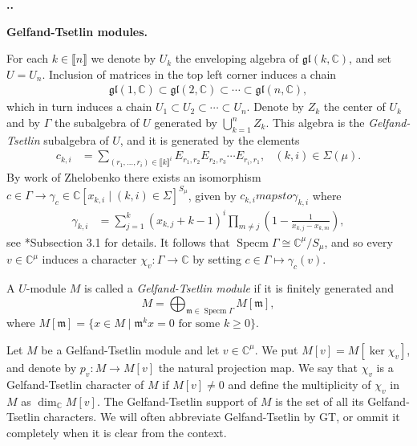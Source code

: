 \documentclass[11pt,fleqn]{amsart}
\renewcommand\thesection{\arabic{section}}
\newcounter{para}[section]
\renewcommand\thepara{\thesection.\arabic{para}}
\def\paragraph{%
 \noindent
 \refstepcounter{para}%
 \textbf{\thepara.}\hspace{1ex}%
}
\newcommand\about[1]{%
 {\bfseries#1.}%
}
\newcommand\CC{\mathbb C}
\renewcommand\to{\longrightarrow}
\newcommand\m{\mathfrak m}
\newcommand\gl{\mathfrak{gl}}
\newcommand\interval[1]{\llbracket #1 \rrbracket}
\DeclareMathOperator\Specm{Specm}
\begin{document}
\paragraph
\about{Gelfand-Tsetlin modules}
For each $k \in \interval{n}$ we denote by $U_k$ the enveloping algebra of 
$\gl(k,\CC)$, and set $U = U_n$. Inclusion of matrices in the top left corner 
induces a chain
\begin{align*}
\gl(1,\CC) \subset \gl(2, \CC) \subset \cdots \subset \gl(n,\CC),
\end{align*}
which in turn induces a chain $U_1 \subset U_2 \subset \cdots \subset U_n$. 
Denote by $Z_k$ the center of $U_k$ and by $\Gamma$ the subalgebra of $U$ 
generated by $\bigcup_{k=1}^n Z_k$. This algebra is the \emph{Gelfand-Tsetlin} 
subalgebra of $U$, and it is generated by the elements
\begin{align*}
c_{k,i}
  &= \sum_{(r_1, \ldots, r_i) \in \interval{k}^i} 
    E_{r_1, r_2} E_{r_2, r_3} \cdots E_{r_i, r_1},
  & (k,i) \in \Sigma(\mu).
\end{align*}
By work of Zhelobenko there exists an isomorphism $c \in \Gamma \to \gamma_c
\in \CC[x_{k,i} \mid (k,i) \in \Sigma]^{S_\mu}$, given by $c_{k,i} mapsto 
\gamma_{k,i}$ where
\begin{align*}
\gamma_{k,i}
  &= \sum_{j=1}^k (x_{k,j} + k - 1)^i 
    \prod_{m \neq j} \left( 
      1 - \frac{1}{x_{k,j} - x_{k,m}}
    \right),
\end{align*}
see \cite{FGR16}*{Subsection 3.1} for details. 
It follows that $\Specm \Gamma \cong \CC^\mu / S_\mu$, and so every 
$v \in \CC^\mu$ induces a character $\chi_v: \Gamma \to \CC$ by setting
$c \in \Gamma \mapsto \gamma_c(v)$. 
\begin{Definition*}
A $U$-module $M$ is called a \emph{Gelfand-Tsetlin module} if it is finitely
generated and
\[
  M = \bigoplus_{\m \in \Specm \Gamma} M[\mathfrak m],
\] 
where $M[\mathfrak m] = \{x \in M \mid \mathfrak m^k x = 0 \mbox{ for some } k 
\geq 0\}$.
\end{Definition*}
Let $M$ be a Gelfand-Tsetlin module and let $v \in \CC^\mu$. We put
$M[v] = M[\ker \chi_v]$, and denote by $p_v: M \to M[v]$ the natural projection
map. We say that $\chi_v$ is a Gelfand-Tsetlin character of $M$ if $M[v] \neq 
0$ and define the multiplicity of $\chi_v$ in $M$ as $\dim_\CC M[v]$. The 
Gelfand-Tsetlin support of $M$ is the set of all its Gelfand-Tsetlin 
characters. We will often abbreviate Gelfand-Tsetlin by GT, or ommit it
completely when it is clear from the context.
\end{document}
